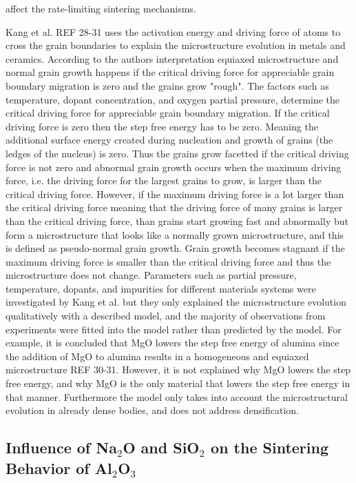 affect the rate-limiting sintering mechanisms.

Kang et al. REF 28-31 uses the activation energy and driving force of atoms to cross the grain boundaries to explain the microstructure evolution in metals and ceramics. According to the authors interpretation equiaxed microstructure and normal grain growth happens if the critical driving force for appreciable grain boundary migration is zero and the  grains grow "rough". The factors such as temperature, dopant concentration, and oxygen partial pressure, determine the critical driving force for appreciable grain boundary migration. If the critical driving force is zero then the step free energy has to be zero. Meaning  the additional surface energy created during nucleation and growth of grains (the ledges of the nucleus) is zero. Thus the grains grow facetted if the critical driving force is not zero and abnormal grain growth occurs when the maximum driving force, i.e. the driving force for the largest grains to grow, is larger than the critical driving force. However, if the maximum driving force is a lot larger than the critical driving force meaning that the driving force of many grains is larger than the critical driving force, than grains start growing fast and abnormally but form a microstructure that looks like a normally grown microstructure, and this is defined as pseudo-normal grain growth. Grain growth becomes stagnant if the maximum driving force is smaller than the critical driving force and thus the microstructure does not change. Parameters such as partial pressure, temperature, dopants, and impurities for different materials systems were investigated by Kang et al. but they only explained the microstructure evolution qualitatively with a described model, and the majority of observations from experiments were fitted into the model rather than predicted by the model. For example, it is concluded that MgO lowers the step free energy of alumina since the addition of MgO to alumina results in a homogeneous and equiaxed microstructure REF 30-31. However, it is not explained why MgO lowers the step free energy, and why MgO is the only material that lowers the step free energy in that manner. Furthermore the model only takes into account the microstructural evolution in already dense bodies, and does not address densification.

\subsection{Influence of Na$_{2}$O and SiO$_{2}$ on the Sintering Behavior of Al$_{2}$O$_{3}$}

